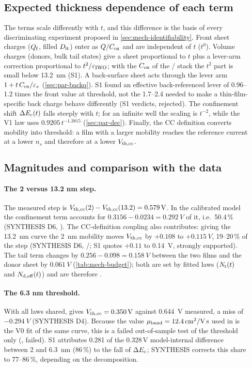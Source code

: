 \subsection{Expected thickness dependence of each term}
The terms scale differently with $t$, and this difference is the basis of every discriminating experiment proposed in \cref{sec:mech-identifiability}. Front sheet charges ($Q_{\mathrm{f}}$, filled $D_{\mathrm{it}}$) enter as $Q/C_{\mathrm{ox}}$ and are independent of $t$ ($t^0$). Volume charges (donors, bulk tail states) give a sheet proportional to $t$ plus a lever-arm correction proportional to $t^2/\varepsilon_{\mathrm{IWO}}$; with the $C_{\mathrm{ox}}$ of the \HfO/\AlO{} stack the $t^2$ part is small below \SI{13.2}{nm} (S1). A back-surface sheet acts through the lever arm $1 + t\,C_{\mathrm{ox}}/\varepsilon_s$ (\cref{sec:par-backq}). S1 found an effective back-referenced lever of 0.96--1.2 times the front value at threshold, not the 1.7--2.4 needed to make a thin-film-specific back charge behave differently (S1 verdicts, rejected). The confinement shift $\Delta E_{\mathrm{c}}(t)$ falls steeply with $t$; for an infinite well the scaling is $t^{-2}$, while the V1 law uses $0.9205\,t^{-1.3815}$ (\cref{sec:par-dec}). Finally, the CC definition converts mobility into threshold: a film with a larger mobility reaches the reference current at a lower $n_s$ and therefore at a lower $V_{\mathrm{th,cc}}$.

\subsection{Magnitudes and comparison with the data}
\paragraph{The 2 versus 13.2 nm step.} The measured step is $V_{\mathrm{th,cc}}(2) - V_{\mathrm{th,cc}}(13.2) = \SI{0.579}{V}$. In the calibrated model the confinement term accounts for $0.3156 - 0.0234 = \SI{0.292}{V}$ of it, i.e.\ 50.4\,\% (SYNTHESIS D6, \evNUM). The CC-definition coupling also contributes: giving the \SI{13.2}{nm} curve the \SI{2}{nm} mobility moves $V_{\mathrm{th,cc}}$ by $+0.108$ to $+\SI{0.115}{V}$, 19--20\,\% of the step (SYNTHESIS D6, \evDATA/\evNUM; S1 quotes $+0.11$ to \SI{0.14}{V}, strongly supported). The tail term changes by $0.256 - 0.098 = \SI{0.158}{V}$ between the two films and the donor sheet by $\SI{0.061}{V}$ (\cref{tab:mech-budget}); both are set by fitted laws ($N_{\mathrm{t}}(t)$ and $N_{\mathrm{d,eff}}(t)$) and are therefore \evCAL.

\paragraph{The 6.3 nm threshold.} With all laws shared,  gives $V_{\mathrm{th,cc}} = \SI{0.350}{V}$ against \SI{0.644}{V} measured, a miss of $-\SI{0.294}{V}$ (SYNTHESIS D4). Because the value $\mu_{\mathrm{band}} = 12.4\,\mathrm{cm}^{2}/\mathrm{V\,s}$ used in  is the V0 fit of the same curve, this is a failed out-of-sample test of the threshold only (\evOOS, failed). S1 attributes 0.281 of the 0.328\,V model-internal difference between 2 and \SI{6.3}{nm} (86\,\%) to the fall of $\Delta E_{\mathrm{c}}$; SYNTHESIS corrects this share to 77--86\,\%, depending on the decomposition.

